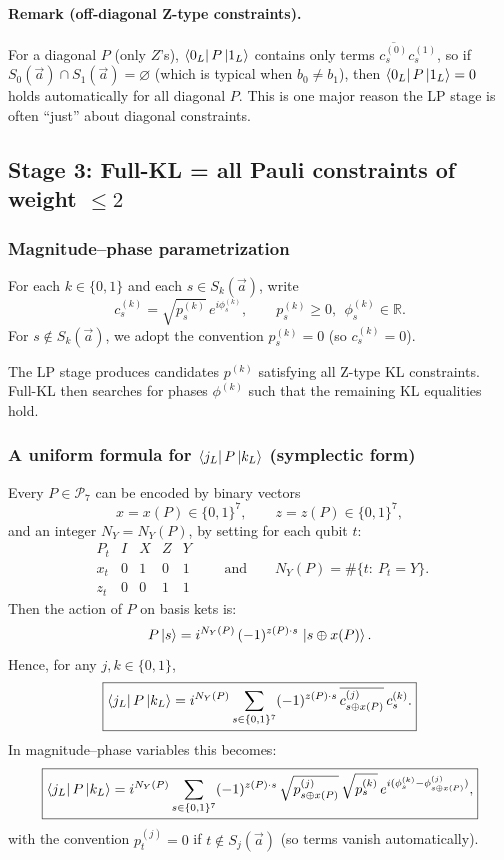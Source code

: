 \documentclass[11pt]{article}
\begin{document}
\paragraph{Remark (off-diagonal Z-type constraints).}
For a diagonal \(P\) (only \(Z\)'s), \(\bra{0_L}P\ket{1_L}\) contains only terms
\(\overline{c_s^{(0)}}c_s^{(1)}\), so if \(S_0(\vec a)\cap S_1(\vec a)=\varnothing\)
(which is typical when \(b_0\neq b_1\)), then \(\bra{0_L}P\ket{1_L}=0\) holds automatically
for all diagonal \(P\). This is one major reason the LP stage is often ``just'' about diagonal constraints.

\subsection{Stage 3: Full-KL = all Pauli constraints of weight \(\le 2\)}

\subsubsection{Magnitude--phase parametrization}

For each \(k\in\{0,1\}\) and each \(s\in S_k(\vec a)\), write
\[
c^{(k)}_s = \sqrt{p^{(k)}_s}\,e^{i\phi^{(k)}_s},
\qquad
p^{(k)}_s\ge 0,\ \ \phi^{(k)}_s\in\mathbb{R}.
\]
For \(s\notin S_k(\vec a)\), we adopt the convention \(p^{(k)}_s=0\) (so \(c^{(k)}_s=0\)).

The LP stage produces candidates \(p^{(k)}\) satisfying all Z-type KL constraints.
Full-KL then searches for phases \(\phi^{(k)}\) such that the remaining KL equalities hold.

\subsubsection{A uniform formula for \texorpdfstring{$\bra{j_L}P\ket{k_L}$}{<jL|P|kL>} (symplectic form)}

Every \(P\in\mathcal{P}_7\) can be encoded by binary vectors
\[
x=x(P)\in\{0,1\}^7,\qquad z=z(P)\in\{0,1\}^7,
\]
and an integer \(N_Y=N_Y(P)\), by setting for each qubit \(t\):
\[
\begin{array}{c|cccc}
P_t & I & X & Z & Y\\ \hline
x_t & 0 & 1 & 0 & 1\\
z_t & 0 & 0 & 1 & 1
\end{array}
\qquad\text{and}\qquad
N_Y(P)=\#\{t:\ P_t=Y\}.
\]
Then the action of \(P\) on basis kets is:
\[
P\ket{s} = i^{N_Y(P)}\,(-1)^{z(P)\cdot s}\,\ket{s\oplus x(P)}.
\]
Hence, for any \(j,k\in\{0,1\}\),
\[
\boxed{
\bra{j_L}P\ket{k_L}
=
i^{N_Y(P)}\sum_{s\in\{0,1\}^7}
(-1)^{z(P)\cdot s}\,
\overline{c^{(j)}_{s\oplus x(P)}}\,c^{(k)}_{s}.
}
\]
In magnitude--phase variables this becomes:
\[
\boxed{
\bra{j_L}P\ket{k_L}
=
i^{N_Y(P)}\sum_{s\in\{0,1\}^7}
(-1)^{z(P)\cdot s}\,
\sqrt{p^{(j)}_{s\oplus x(P)}}\,\sqrt{p^{(k)}_{s}}\,
e^{i(\phi^{(k)}_{s}-\phi^{(j)}_{s\oplus x(P)})},
}
\]
with the convention \(p^{(j)}_t=0\) if \(t\notin S_j(\vec a)\) (so terms vanish automatically).
\end{document}

